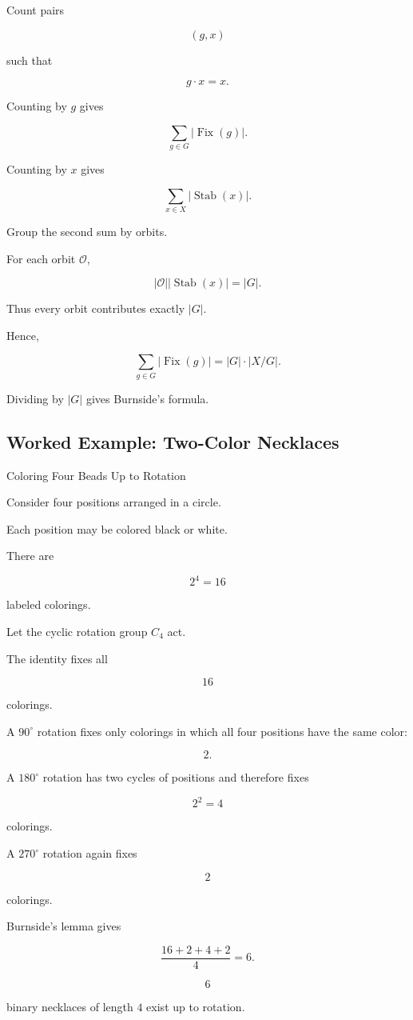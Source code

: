 Count pairs

\[
(g,x)
\]

such that

\[
g\cdot x=x.
\]

Counting by \(g\) gives

\[
\sum_{g\in G}
|\operatorname{Fix}(g)|.
\]

Counting by \(x\) gives

\[
\sum_{x\in X}
|\operatorname{Stab}(x)|.
\]

Group the second sum by orbits.

For each orbit \(\mathcal{O}\),

\[
|\mathcal{O}|
|\operatorname{Stab}(x)|
=
|G|.
\]

Thus every orbit contributes exactly \(|G|\).

Hence,

\[
\sum_{g\in G}
|\operatorname{Fix}(g)|
=
|G|\cdot|X/G|.
\]

Dividing by \(|G|\) gives Burnside's formula.

\subsection{Worked Example: Two-Color Necklaces}
\label{subsec:worked-burnside-necklace}

\begin{workedexamplebox}{Coloring Four Beads Up to Rotation}

Consider four positions arranged in a circle.

Each position may be colored black or white.

There are

\[
2^4=16
\]

labeled colorings.

Let the cyclic rotation group \(C_4\) act.

The identity fixes all

\[
16
\]

colorings.

A \(90^\circ\) rotation fixes only colorings in which all four positions
have the same color:

\[
2.
\]

A \(180^\circ\) rotation has two cycles of positions and therefore fixes

\[
2^2=4
\]

colorings.

A \(270^\circ\) rotation again fixes

\[
2
\]

colorings.

Burnside's lemma gives

\[
\frac{16+2+4+2}{4}
=
6.
\]

\begin{answerbox}
\[
\boxed{
6
}
\]

binary necklaces of length \(4\) exist up to rotation.
\end{answerbox}

\end{workedexamplebox}


